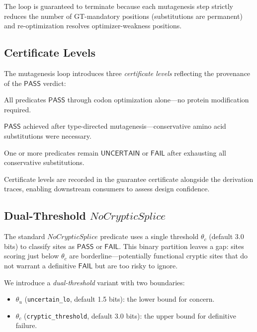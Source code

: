 \documentclass[runningheads]{llncs}
\newcommand{\PASS}{\ensuremath{\mathsf{PASS}}\xspace}
\newcommand{\FAIL}{\ensuremath{\mathsf{FAIL}}\xspace}
\newcommand{\UNCERTAIN}{\ensuremath{\mathsf{UNCERTAIN}}\xspace}
\begin{document}
The loop is guaranteed to terminate because each mutagenesis step strictly reduces the number of GT-mandatory positions (substitutions are permanent) and re-optimization resolves optimizer-weakness positions.

\subsection{Certificate Levels}

The mutagenesis loop introduces three \emph{certificate levels} reflecting the provenance of the \PASS{} verdict:

\begin{description}[leftmargin=!,labelwidth=1.4cm,itemsep=0pt,topsep=1pt]
\item[GOLD] All predicates \PASS{} through codon optimization alone---no protein modification required.
\item[SILVER] \PASS{} achieved after type-directed mutagenesis---conservative amino acid substitutions were necessary.
\item[BRONZE] One or more predicates remain \UNCERTAIN{} or \FAIL{} after exhausting all conservative substitutions.
\end{description}

Certificate levels are recorded in the guarantee certificate alongside the derivation traces, enabling downstream consumers to assess design confidence.

\subsection{Dual-Threshold \texorpdfstring{$\mathit{NoCrypticSplice}$}{NoCrypticSplice}}\label{sec:dualthresh}

The standard $\mathit{NoCrypticSplice}$ predicate uses a single threshold $\theta_c$ (default 3.0 bits) to classify sites as \PASS{} or \FAIL.
This binary partition leaves a gap: sites scoring just below $\theta_c$ are borderline---potentially functional cryptic sites that do not warrant a definitive \FAIL{} but are too risky to ignore.

We introduce a \emph{dual-threshold} variant with two boundaries:
\begin{itemize}[leftmargin=*,itemsep=0pt,topsep=1pt]
\item $\theta_u$ (\texttt{uncertain\_lo}, default 1.5 bits): the lower bound for concern.
\item $\theta_c$ (\texttt{cryptic\_threshold}, default 3.0 bits): the upper bound for definitive failure.
\end{itemize}
\end{document}
